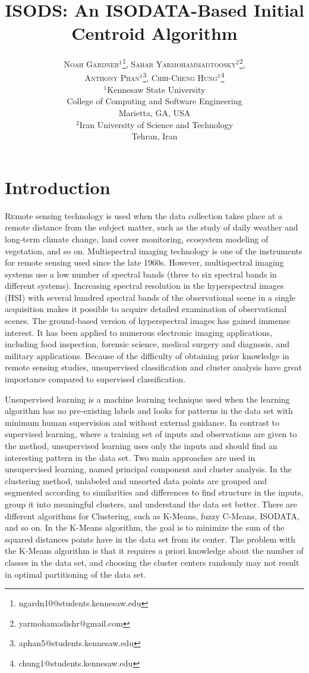 \documentclass[twoside,twocolumn]{article}
\title{ISODS: An ISODATA-Based Initial Centroid Algorithm} %
\author{%
  \textsc{
    Noah Gardner$^1$\thanks{ngardn10@students.kennesaw.edu}, 
    Sahar Yarmohammadtoosky$^2$\thanks{yarmohamadishr@gmail.com},
    }\\[1ex]
  \textsc{
    Anthony Phan$^1$\thanks{aphan5@students.kennesaw.edu},
    Chih-Cheng Hung$^1$\thanks{chung1@students.kennesaw.edu}} \\[1ex]
  \normalsize $^1$Kennesaw State University \\
  \normalsize College of Computing and Software Engineering \\
  \normalsize Marietta, GA, USA \\[1ex]
  \normalsize $^2$Iran University of Science and Technology \\
  \normalsize Tehran, Iran
}
\date{} %
\begin{document}
\maketitle


\section{Introduction}

\lettrine[nindent=0em,lines=3]{R} emote sensing technology is used when
the data collection takes place at a remote distance from the subject matter,
such as the study of daily weather and long-term climate change, land cover
monitoring, ecosystem modeling of vegetation, and so on. Multispectral imaging
technology is one of the instruments for remote sensing used since the late
1960s. However, multispectral imaging systems use a low number of spectral bands
(three to six spectral bands in different systems). Increasing spectral
resolution in the hyperspectral images (HSI) with several hundred spectral bands
of the observational scene in a single acquisition makes it possible to acquire
detailed examination of observational scenes. The ground-based version of
hyperspectral images has gained immense interest. It has been applied to
numerous electronic imaging applications, including food inspection, forensic
science, medical surgery and diagnosis, and military applications. Because of
the difficulty of obtaining prior knowledge in remote sensing studies,
unsupervised classification and cluster analysis have great importance compared
to supervised classification. 

Unsupervised learning is a machine learning technique used when the learning
algorithm has no pre-existing labels and looks for patterns in the data set with
minimum human supervision and without external guidance. In contrast to
supervised learning, where a training set of inputs and observations are given
to the method, unsupervised learning uses only the inputs and should find an
interesting pattern in the data set. Two main approaches are used in
unsupervised learning, named principal component and cluster analysis. In the
clustering method, unlabeled and unsorted data points are grouped and segmented
according to similarities and differences to find structure in the inputs, group
it into meaningful clusters, and understand the data set better. There are
different algorithms for Clustering, such as K-Means, fuzzy C-Means, ISODATA,
and so on. In the K-Means algorithm, the goal is to minimize the sum of the
squared distances points have in the data set from its center. The problem with
the K-Means algorithm is that it requires a priori knowledge about the number of
classes in the data set, and choosing the cluster centers randomly may not
result in optimal partitioning of the data set.
\end{document}

